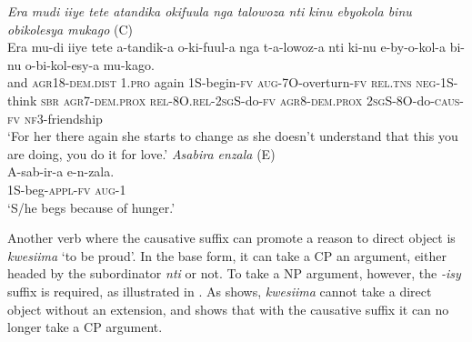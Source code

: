 \documentclass[output=paper,colorlinks,citecolor=brown,draftmode]{langscibook}
\begin{document}
\ea
\begin{xlist}   \label{ex:Saebo:reason}
 \ex \emph{Era mudi iiye tete atandika okifuula nga talowoza nti 	kinu ebyokola binu obikolesya mukago } (C) \\
  \gll Era mu-di iiye tete a-tandik-a o-ki-fuul-a nga t-a-lowoz-a nti 	ki-nu e-by-o-kol-a bi-nu o-bi-kol-esy-a mu-kago.  \\ 
and \textsc{agr18-dem.dist} \textsc{1.pro} again  1S-begin-\textsc{fv} \textsc{aug-}7O-overturn-\textsc{fv} \textsc{rel.tns} \textsc{neg}-1S-think \textsc{sbr} \textsc{agr7-dem.prox} \textsc{rel}-8O.\textsc{rel-2sg}S-do-\textsc{fv} \textsc{agr8-dem.prox} \textsc{2sg}S-8O-do-\textsc{caus-fv} \textsc{nf3}-friendship
\\
    \glt  `For her there again she starts to change as she doesn't understand that this you are doing, you do it for love.' 
     \ex \emph{Asabira 		enzala} (E)\\
  \gll A-sab-ir-a 		e-n-zala. \\ 
1S-beg-\textsc{appl-fv}  \textsc{aug-1}\\
    \glt  `S/he begs because of hunger.' 
      \end{xlist}     
      \z

Another verb where the causative suffix can promote a reason to direct object is \emph{kwesiima} `to be proud'. In the base form, it can take a CP an argument, either headed by the subordinator \emph{nti} or not. To take a NP argument, however, the \emph{-isy} suffix is required, as illustrated in . As  shows, \emph{kwesiima} cannot take a direct object without an extension, and  shows that with the causative suffix it can no longer take a CP argument. 
\end{document}
